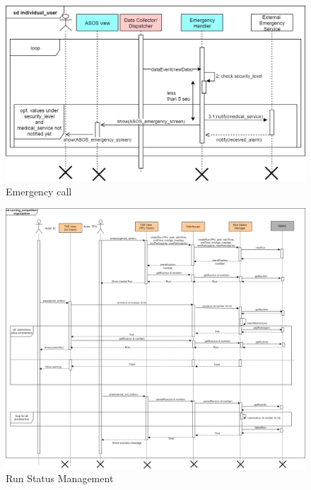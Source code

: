 \begin{figure}[H]
\caption{Emergency call}
\centering
\includegraphics[width = \textwidth]{sections/architecturalDesign/emergencyCall.png}
\end{figure}
\begin{figure}[H]
\caption{Run Status Management}
\centering
\includegraphics[width = \textwidth]{sections/architecturalDesign/raceManager.png}
\end{figure}
